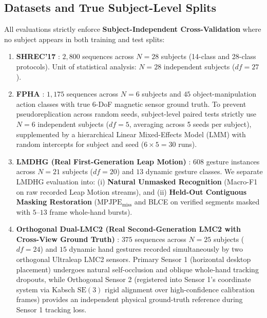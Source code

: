 \documentclass[10pt,twocolumn]{article}
\begin{document}
\subsection{Datasets and True Subject-Level Splits}
All evaluations strictly enforce \textbf{Subject-Independent Cross-Validation} where no subject appears in both training and test splits:
\begin{enumerate}
    \item \textbf{SHREC'17} \cite{de2017shrec}: $2,800$ sequences across $N=28$ subjects (14-class and 28-class protocols). Unit of statistical analysis: $N=28$ independent subjects ($df=27$).
    \item \textbf{FPHA} \cite{garcia2018first}: $1,175$ sequences across $N=6$ subjects and $45$ object-manipulation action classes with true 6-DoF magnetic sensor ground truth. To prevent pseudoreplication across random seeds, subject-level paired tests strictly use $N=6$ independent subjects ($df=5$, averaging across 5 seeds per subject), supplemented by a hierarchical Linear Mixed-Effects Model (LMM) with random intercepts for subject and seed ($6 \times 5 = 30$ runs).
    \item \textbf{LMDHG (Real First-Generation Leap Motion)} \cite{boulahia2017dynamic}: $608$ gesture instances across $N=21$ subjects ($df=20$) and $13$ dynamic gesture classes. We separate LMDHG evaluation into: (i) \textbf{Natural Unmasked Recognition} (Macro-F1 on raw recorded Leap Motion streams), and (ii) \textbf{Held-Out Contiguous Masking Restoration} ($\text{MPJPE}_{\text{miss}}$ and BLCE on verified segments masked with $5\text{--}13$ frame whole-hand bursts).
    \item \textbf{Orthogonal Dual-LMC2 (Real Second-Generation LMC2 with Cross-View Ground Truth)} \cite{gilmartin2024duallmc2}: $375$ sequences across $N=25$ subjects ($df=24$) and $15$ dynamic hand gestures recorded simultaneously by two orthogonal Ultraleap LMC2 sensors. Primary Sensor 1 (horizontal desktop placement) undergoes natural self-occlusion and oblique whole-hand tracking dropouts, while Orthogonal Sensor 2 (registered into Sensor 1's coordinate system via Kabsch $\text{SE}(3)$ rigid alignment over high-confidence calibration frames) provides an independent physical ground-truth reference during Sensor 1 tracking loss.
\end{enumerate}
\end{document}
